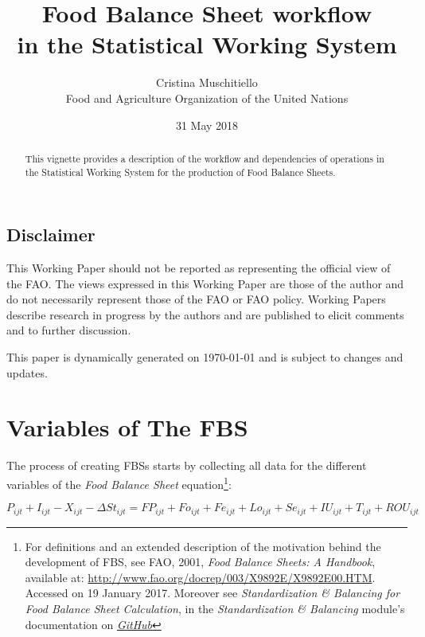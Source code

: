 \documentclass[]{article}
\title{Food Balance Sheet workflow\\
in the Statistical Working System}
\author{Cristina Muschitiello\\
Food and Agriculture Organization of the United Nations}
\date{31 May 2018}
\let\rmarkdownfootnote\footnote%
\def\footnote{\protect\rmarkdownfootnote}
\begin{document}
\maketitle
\begin{abstract}
This vignette provides a description of the workflow and dependencies of
operations in the Statistical Working System for the production of Food
Balance Sheets.
\end{abstract}

{
\setcounter{tocdepth}{4}
\tableofcontents
}
\listoftables

\listoffigures

\newpage

\subsection*{Disclaimer}\label{disclaimer}

This Working Paper should not be reported as representing the official
view of the FAO. The views expressed in this Working Paper are those of
the author and do not necessarily represent those of the FAO or FAO
policy. Working Papers describe research in progress by the authors and
are published to elicit comments and to further discussion.

This paper is dynamically generated on \today{} and is subject to
changes and updates.

\section*{Variables of The FBS}\label{variables-of-the-fbs}

The process of creating FBSs starts by collecting all data for the
different variables of the \emph{Food Balance Sheet} equation\footnote{For
  definitions and an extended description of the motivation behind the
  development of FBS, see FAO, 2001, \emph{Food Balance Sheets: A
  Handbook}, available at:
  \url{http://www.fao.org/docrep/003/X9892E/X9892E00.HTM}. Accessed on
  19 January 2017. Moreover see \emph{Standardization \& Balancing for
  Food Balance Sheet Calculation}, in the \emph{Standardization \&
  Balancing} module's documentation on
  \href{https://github.com/SWS-Methodology/faoswsStandardization/tree/master/documentation}{\emph{GitHub}}}:

\begin{equation}
\label{eq:balance1}
P_{ijt} + I_{ijt} - X_{ijt} - \Delta St_{ijt} = FP_{ijt} + Fo_{ijt} + Fe_{ijt} + Lo_{ijt} + Se_{ijt} + IU_{ijt} + T_{ijt}  + ROU_{ijt}
\end{equation}
\end{document}

